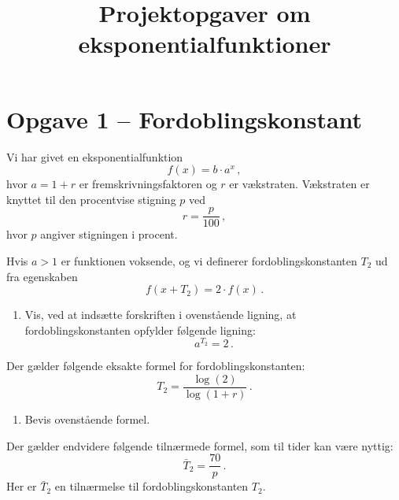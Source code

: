 \documentclass[12pt,oneside,a4paper]{article}
\title{Projektopgaver om eksponentialfunktioner}
\date{\vspace{-5ex}}
\theoremstyle{plain}
\begin{document}
\maketitle

\section*{Opgave 1 -- Fordoblingskonstant}
Vi har givet en eksponentialfunktion
\[
    f(x) = b\cdot a^x\,,
\]
hvor $a=1+r$ er fremskrivningsfaktoren og $r$ er vækstraten.
Vækstraten er knyttet til den procentvise stigning $p$ ved
\[
    r = \frac{p}{100}\,,
\]
hvor $p$ angiver stigningen i procent.

Hvis $a>1$ er funktionen voksende, og vi definerer fordoblingskonstanten
$T_2$ ud fra egenskaben
\[
    f(x+T_2) = 2\cdot f(x)\,.
\]

\begin{enumerate}[label=(\alph*)]
    \item Vis, ved at indsætte forskriften i ovenstående ligning, at 
fordoblingskonstanten opfylder følgende ligning:
\[
    a^{T_2} = 2\,.
\]
\end{enumerate}

Der gælder følgende eksakte formel for fordoblingskonstanten:
\[
    T_2 = \frac{\log(2)}{\log(1+r)}\,.
\]
\begin{enumerate}[label=(\alph*), resume]
    \item Bevis ovenstående formel.
\end{enumerate}

Der gælder endvidere følgende tilnærmede formel, som til tider kan være nyttig:
\[
    \bar T_2 = \frac{70}{p} \,.
\]
Her er $\bar T_2$ en tilnærmelse til fordoblingskonstanten $T_2$.
\end{document}
